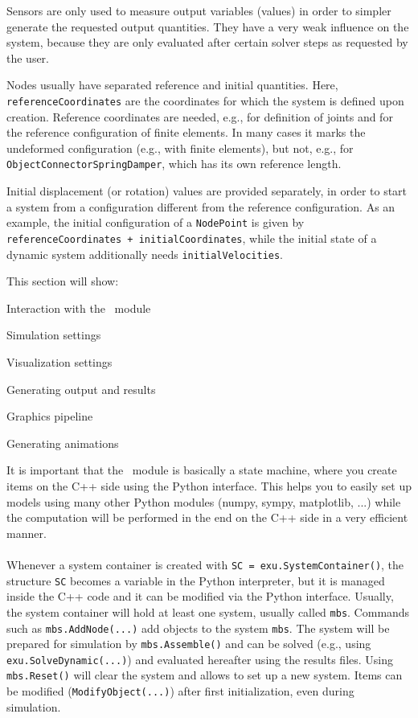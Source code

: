 Sensors are only used to measure output variables (values) in order to simpler generate the requested output quantities.
They have a very weak influence on the system, because they are only evaluated after certain solver steps as requested by the user.

Nodes usually have separated reference and initial quantities. Here, 
\texttt{referenceCoordinates} are the coordinates for which the system is defined upon creation. Reference coordinates are needed, e.g., for definition of joints and for the reference configuration of finite elements. In many cases it marks the undeformed configuration (e.g., with finite elements), but not, e.g., for \texttt{ObjectConnectorSpringDamper}, which has its own reference length. 

Initial displacement (or rotation) values are provided separately, in order to start a system from a configuration different from the reference configuration.
As an example, the initial configuration of a \texttt{NodePoint} is given by \texttt{referenceCoordinates + initialCoordinates}, while the initial state of a dynamic system additionally needs \texttt{initialVelocities}.


 \label{sec:exudynBasics}
This section will show:
\bi
  \item Interaction with the \codeName\ module
  \item Simulation settings
  \item Visualization settings
  \item Generating output and results
  \item Graphics pipeline
  \item Generating animations
\ei


It is important that the \codeName\ module is basically a state machine, where you create items on the C++ side using the Python interface. This helps you to easily set up models using many other Python modules (numpy, sympy, matplotlib, ...) while the computation will be performed in the end on the C++ side in a very efficient manner. 
\vspace{12pt}\\
\vspace{6pt}\\
Whenever a system container is created with \texttt{SC = exu.SystemContainer()}, the structure \texttt{SC} becomes a variable in the Python interpreter, but it is managed inside the C++ code and it can be modified via the Python interface.
Usually, the system container will hold at least one system, usually called \texttt{mbs}.
Commands such as \texttt{mbs.AddNode(...)} add objects to the system \texttt{mbs}. 
The system will be prepared for simulation by \texttt{mbs.Assemble()} and can be solved (e.g., using \texttt{exu.SolveDynamic(...)}) and evaluated hereafter using the results files.
Using \texttt{mbs.Reset()} will clear the system and allows to set up a new system. Items can be modified (\texttt{ModifyObject(...)}) after first initialization, even during simulation.
%

